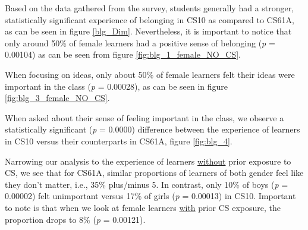 \documentclass[oneside,titlepage,numbers=noenddot,headinclude,%
               footinclude=true,cleardoublepage=empty,abstractoff,BCOR=2mm,%
               paper=a4,fontsize=11pt,ngerman,american]{scrreprt}
\numberwithin{theorem}{chapter}
\numberwithin{definition}{chapter}
\numberwithin{algorithm}{chapter}
\numberwithin{figure}{chapter}
\numberwithin{table}{chapter}
\numberwithin{equation}{chapter}
\begin{document}
Based on the data gathered from the survey, students generally had a stronger, statistically significant experience of belonging in CS10 as compared to CS61A, as can be seen in figure \ref{blg_Dim}. Nevertheless, it is important to notice that only around 50\% of female learners had a positive sense of belonging (\emph{p} = 0.00104) as can be seen from figure \ref{fig:blg_1_female_NO_CS}. 

When focusing on ideas, only about 50\% of female learners felt their ideas were important in the class (\emph{p} = 0.00028), as can be seen in figure \ref{fig:blg_3_female_NO_CS}. 

When asked about their sense of feeling important in the class, we observe a statistically significant (\emph{p} = 0.0000) difference between the experience of learners in CS10 versus their counterparts in CS61A, figure \ref{fig:blg_4}. 

Narrowing our analysis to the experience of learners \underline{without} prior exposure to CS, we see that for CS61A, similar proportions of learners of both gender feel like they don't matter, i.e., 35\% plus/minus 5. In contrast, only 10\% of boys (\emph{p} = 0.00002) felt unimportant versus 17\% of girls (\emph{p} = 0.00013) in CS10. Important to note is that when we look at female learners \underline{with} prior CS exposure, the proportion drops to 8\% (\emph{p} = 0.00121).
\end{document}
